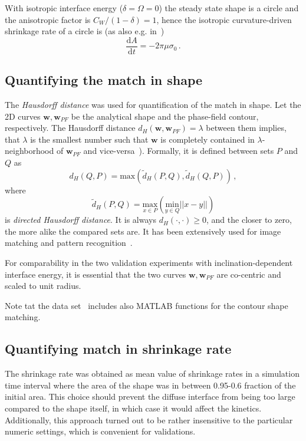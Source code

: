 With isotropic interface energy ($\delta=\Omega=0$) the steady state shape is a circle and the anisotropic factor is $C_W/(1-\delta)=1$, hence the isotropic curvature-driven shrinkage rate of a circle is (as also e.g. in~\cite{Moelans2009})
\begin{equation} \label{eq_iso_shrrate}
	\frac{\mathrm{d}A}{\mathrm{d}t} = -2\pi\mu\sigma_0 \,.
\end{equation}

\subsection{Quantifying the match in shape}
The \textit{Hausdorff distance} was used for quantification of the match in shape. Let the 2D curves $\bm{w},\bm{w}_{PF}$ be the analytical shape and the phase-field contour, respectively. The Hausdorff distance $d_H(\bm{w},\bm{w}_{PF})=\lambda$ between them implies, that $\lambda$ is the smallest number such that $ \bm{w} $ is completely contained in $\lambda$-neighborhood of $\bm{w}_{PF}$ and vice-versa~\cite{Alt2004}). Formally, it is defined between sets $P$ and $Q$ as 
\begin{equation}
	d_H(Q,P)=\mathrm{max}(\tilde{d}_H(P,Q),\tilde{d}_H(Q,P)) \,,
\end{equation}
where 
\begin{equation}
	\tilde{d}_H(P,Q)=\underset{x\in P}{\mathrm{max}}( \underset{y\in Q}{\mathrm{min}}||x-y|| )
\end{equation}
is \textit{directed Hausdorff distance}. It is always $d_H(\cdot,\cdot)\geq 0$, and the closer to zero, the more alike the compared sets are. It has been extensively used for image matching and pattern recognition~\cite{LiZhu2014}. 

For comparability in the two validation experiments with inclination-dependent interface energy, it is essential that the two curves $\bm{w},\bm{w}_{PF}$ are co-centric and scaled to unit radius.

Note tat the data set~\cite{Minar2022dataset} includes also MATLAB functions for the contour shape matching.

\subsection{Quantifying match in shrinkage rate}
The shrinkage rate was obtained as mean value of shrinkage rates in a simulation time interval where the area of the shape was in between 0.95-0.6 fraction of the initial area. This choice should prevent the diffuse interface from being too large compared to the shape itself, in which case it would affect the kinetics. Additionally, this approach turned out to be rather insensitive to the particular numeric settings, which is convenient for validations. 

